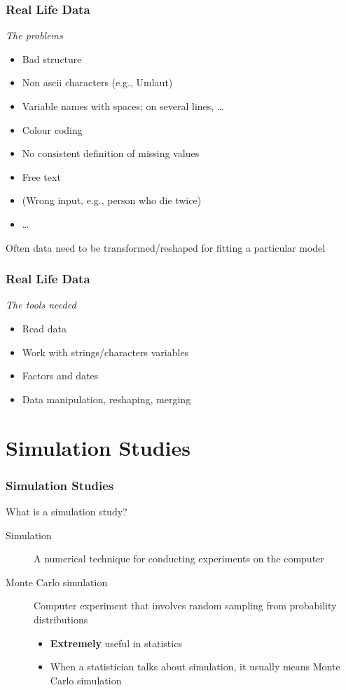 \documentclass[paper=screen,mathserif]{beamer}\usepackage[]{graphicx}\usepackage[]{color}
\newcommand{\ft}[1]{\frametitle{#1}}
\begin{document}
\begin{frame}
  \ft{Real Life Data}
  {\em The problems}
  \begin{itemize}
  \item Bad structure
  \item Non ascii characters (e.g., Umlaut)
  \item Variable names with spaces; on several lines, \dots
  \item Colour coding
  \item No consistent definition of missing values
  \item Free text
  \item (Wrong input, e.g., person who die twice)
  \item \dots
  \end{itemize}\pause
  Often data need to be transformed/reshaped for fitting a particular model
\end{frame}

\begin{frame}
  \ft{Real Life Data}
  
  {\em The tools needed}
  \begin{itemize}
  \item Read data
  \item Work with strings/characters variables
  \item Factors and dates
  \item Data manipulation, reshaping, merging
  \end{itemize}

\end{frame}

\section{Simulation Studies}

\begin{frame}
  \frametitle{Simulation Studies}
  What is a simulation study?
  \begin{description}
  \item[Simulation] A numerical technique for conducting experiments
    on the computer
  \item[Monte Carlo simulation] Computer experiment that involves
    random sampling from probability distributions
    \begin{itemize}
    \item {\bf Extremely} useful in statistics
    \item When a statistician talks about simulation, it usually means
      Monte Carlo simulation
    \end{itemize}
  \end{description}
\end{frame}
\end{document}
